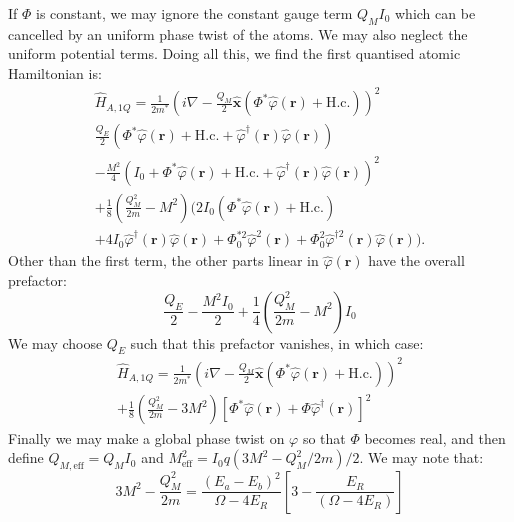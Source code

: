 \documentclass[twocolumn]{revtex4-1}
\renewcommand{\vec}[1]{\mathbf{#1}}
\begin{document}
If $\Phi$ is constant, we may ignore the constant gauge term $Q_M I_0$
which can be cancelled by an uniform phase twist of the atoms.  We may
also neglect the uniform potential terms.  Doing all this, we find the
first quantised atomic Hamiltonian is:
\begin{multline}
  \hat{H}_{A,1Q} =
  \frac{1}{2m^\ast}
  \left(i \nabla - 
    \frac{Q_M}{2} \hat{\vec{x}} 
    \left(
      \Phi^\ast \hat{\varphi}(\vec{r}) +\text{H.c.}
    \right)
  \right)^2
  \\
  \frac{Q_E}{2} 
  \left(
    \Phi^\ast \hat{\varphi}(\vec{r}) +\text{H.c.}
    +
    \hat{\varphi}^\dagger(\vec{r}) \hat{\varphi}(\vec{r})
  \right)
  \\- \frac{M^2}{4}
  \left(I_0+ \Phi^\ast \hat{\varphi}(\vec{r}) +\text{H.c.}
    + \hat{\varphi}^\dagger(\vec{r}) \hat{\varphi}(\vec{r})
  \right)^2
  \\
  + \frac{1}{8}\left( \frac{Q_M^2}{2m} - M^2\right)
  \biggl(
    2 I_0\left( \Phi^\ast \hat{\varphi}(\vec{r}) +\text{H.c.} \right)
    \\+
    4 I_0 \hat{\varphi}^\dagger(\vec{r}) \hat{\varphi}(\vec{r})
    +
    \Phi_0^{\ast 2}\hat{\varphi}^2(\vec{r})
    +
    \Phi_0^{2}\hat{\varphi}^{\dagger 2}(\vec{r}) \hat{\varphi}(\vec{r})
  \biggr).
\end{multline}
Other than the first term, the other parts linear in $\hat{\varphi}(\vec{r})$
have the overall prefactor:
\begin{displaymath}
  \frac{Q_E}{2} - \frac{M^2 I_0}{2}
  +\frac{1}{4}\left( \frac{Q_M^2}{2m} - M^2\right)I_0
\end{displaymath}
We may choose $Q_E$ such that this prefactor vanishes, in which case:
\begin{multline}
  \hat{H}_{A,1Q} =
  \frac{1}{2m^\ast}
  \left(i \nabla - 
    \frac{Q_M}{2} \hat{\vec{x}} 
    \left(
      \Phi^\ast \hat{\varphi}(\vec{r}) +\text{H.c.}
    \right)
  \right)^2
  \\
  + \frac{1}{8}\left( \frac{Q_M^2}{2m} - 3M^2\right)
  \left[ \Phi^{\ast} \hat{\varphi}(\vec{r})
    + \Phi \hat{\varphi}^{\dagger}(\vec{r}) 
  \right]^2
\end{multline}
Finally we may make a global phase twist on $\varphi$ so that $\Phi$
becomes real, and then define ${Q}_{M,\text{eff}}= {Q_M} I_0$ and
$M_\text{eff}^2=I_0q(3 M^2 - Q_M^2/2m)/2$. We may note that:
\begin{displaymath}
  3 M^2 - \frac{Q_M^2}{2m}=
  \frac{(E_a-E_b)^2}{\Omega-4E_R} \left[
    3
    - 
    \frac{E_R}{(\Omega-4E_R)} \right]
\end{displaymath}
\end{document}
